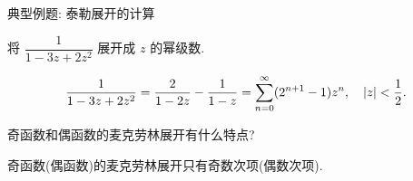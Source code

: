 \begin{frame}{典型例题: 泰勒展开的计算}
	\onslide<+->
	\begin{exercise}
		将 $\dfrac1{1-3z+2z^2}$ 展开成 $z$ 的幂级数.
	\end{exercise}

	\onslide<+->
	\begin{answer}
	\[
		\frac1{1-3z+2z^2}=\frac{2}{1-2z}-\frac1{1-z}
		=\sum_{n=0}^\infty(2^{n+1}-1)z^n,\quad |z|<\frac{1}{2} .
	\]
	\end{answer}

	\onslide<+->
	\begin{thinking}
		奇函数和偶函数的麦克劳林展开有什么特点?
	\end{thinking}

	\onslide<+->
	\begin{answer}
		奇函数(偶函数)的麦克劳林展开只有奇数次项(偶数次项).
	\end{answer}
\end{frame}

